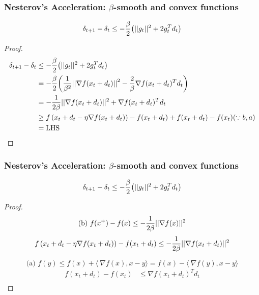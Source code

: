 \begin{frame}\frametitle{ Nesterov’s Acceleration: $\beta$-smooth and convex functions}
$$\delta_{t+1} - \delta_{t} \leq -{\beta \over 2}{\left(||g_t||^2 + 2g_t^Td_t\right)}$$
\begin{proof}

\begin{align*}
\delta_{t+1} - \delta_{t} &\leq -{\beta \over 2}{\left(||g_t||^2 + 2g_t^Td_t\right)} \\
&=  -{\beta \over 2}{\left({1 \over \beta^2}{||\nabla f(x_t+d_t)||}^2 -{2 \over \beta}\nabla f(x_t+d_t)^Td_t\right)} \\
&= -{1 \over 2\beta}||\nabla f(x_t+d_t)||^2+\nabla f(x_t+d_t)^Td_t \\
&\geq f \left(x_t+d_t-\eta \nabla f(x_t+d_t)\right) -f(x_t+d_t)+f(x_t+d_t) -f(x_t) (\because{b,a}) \\
&=\text{LHS}\\
\end{align*}

\end{proof}

\end{frame}

\begin{frame}\frametitle{ Nesterov’s Acceleration: $\beta$-smooth and convex functions}
$$\delta_{t+1} - \delta_{t} \leq -{\beta \over 2}{\left(||g_t||^2 + 2g_t^Td_t\right)}$$
\begin{proof}
 $$\text{(b) }f(x^+) - f(x) \leq - {1\over {2\beta}} ||\nabla f(x)||^2$$ 
\begin{align*}
  f \left(x_t+d_t-\eta \nabla f(x_t+d_t)\right) -f(x_t+d_t) &\leq -{1 \over 2\beta}||\nabla f(x_t+d_t)||^2  \\
\end{align*}

\begin{spacing}{0.05}
\end{spacing}

$$\text{(a) }f(y) \leq f(x) + \langle\ \nabla f(x), x-y\rangle = f(x)-\langle\ \nabla f(y), x-y\rangle$$ 
\begin{align*}
  f(x_t+d_t) -f(x_t) &\leq \nabla f(x_t+d_t)^Td_t  \\
\end{align*}

\end{proof}

\end{frame}


